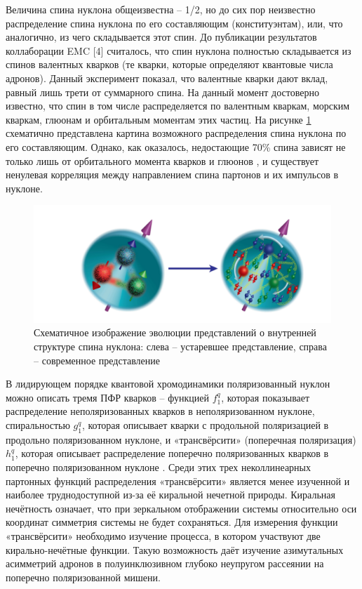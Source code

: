 \documentclass{extarticle}
\begin{document}
 Величина спина нуклона общеизвестна – 1/2, но до сих пор неизвестно распределение спина нуклона по его составляющим (конституэнтам), или, что аналогично, из чего складывается этот спин. До публикации результатов коллаборации EMC [4] считалось, что спин нуклона полностью складывается из спинов валентных кварков (те кварки, которые определяют квантовые числа адронов). Данный эксперимент показал, что валентные кварки дают вклад, равный лишь трети от суммарного спина. На данный момент достоверно известно, что спин в том числе распределяется по валентным кваркам, морским кваркам, глюонам и орбитальным моментам этих частиц. На рисунке \ref{fig:nucleo} схематично представлена картина возможного распределения спина нуклона по его составляющим.
 Однако, как оказалось, недостающие 70\% спина зависят не только лишь от орбитального момента кварков и глюонов \cite{Hagler}, и существует ненулевая корреляция между направлением спина партонов и их импульсов в нуклоне. 

\begin{figure}[ht]
    \centering
    \includegraphics[width = 0.9\linewidth]{nucleo.png}
    \caption{Схематичное изображение эволюции представлений о внутренней структуре спина нуклона: слева – устаревшее представление, справа – современное представление}
    \label{fig:nucleo}
\end{figure}
 

 В лидирующем порядке квантовой хромодинамики поляризованный нуклон можно описать тремя ПФР кварков – функцией $f_1^q$, которая показывает распределение неполяризованных кварков в неполяризованном нуклоне, спиральностью $g_1^q$, которая описывает кварки с продольной поляризацией в продольно поляризованном нуклоне, и «трансвёрсити» (поперечная поляризация) $h_1^q$, которая описывает распределение поперечно поляризованных кварков в поперечно поляризованном нуклоне \cite{Hagler}. Среди этих трех неколлинеарных партонных функций распределения «трансвёрсити» является менее изученной и наиболее труднодоступной из-за её киральной нечетной природы. Киральная нечётность означает, что при зеркальном отображении системы относительно оси координат симметрия системы не будет сохраняться.
Для измерения функции «трансвёрсити» необходимо изучение процесса, в котором участвуют две кирально-нечётные функции. Такую возможность даёт изучение азимутальных асимметрий адронов в полуинклюзивном глубоко неупругом рассеянии на поперечно поляризованной мишени. 
\end{document}
